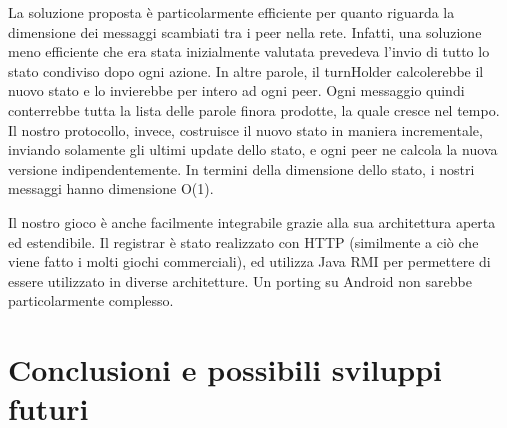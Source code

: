\documentclass[9pt]{article}
\begin{document}
La soluzione proposta è particolarmente efficiente per quanto riguarda la dimensione dei messaggi scambiati tra i peer nella rete. Infatti, una soluzione meno efficiente che era stata inizialmente valutata prevedeva l'invio di tutto lo stato condiviso dopo ogni azione. In altre parole, il turnHolder calcolerebbe il nuovo stato e lo invierebbe per intero ad ogni peer. Ogni messaggio quindi conterrebbe tutta la lista delle parole finora prodotte, la quale cresce nel tempo. Il nostro protocollo, invece, costruisce il nuovo stato in maniera incrementale, inviando solamente gli ultimi update dello stato, e ogni peer ne calcola la nuova versione indipendentemente. In termini della dimensione dello stato, i nostri messaggi hanno dimensione O(1).


Il nostro gioco è anche facilmente integrabile grazie alla sua architettura aperta ed estendibile. Il registrar è stato realizzato con HTTP (similmente a ciò che viene fatto i molti giochi commerciali), ed utilizza Java RMI per permettere di essere utilizzato in diverse architetture. Un porting su Android non sarebbe particolarmente complesso.


\section{Conclusioni e possibili sviluppi futuri}
\end{document}
